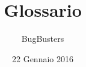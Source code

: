 
%



\usepackage{tracklang}
\usepackage[toc,nonumberlist,nopostdot]{glossaries}

\title{\textbf{Glossario}}
\author{BugBusters}

\date{22 Gennaio 2016}

\makeglossaries






\makeFrontPage


\glsaddall %
\printglossary[title=Glossario,toctitle=Glossario dei termini,style=indexgroup,style=altlistgroup]


